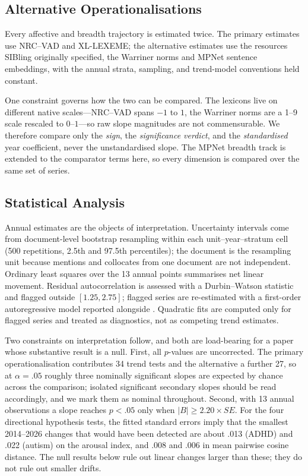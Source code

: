 \documentclass[final]{clv2025}
\begin{document}
\subsection{Alternative Operationalisations}
\label{sec:alternatives}

Every affective and breadth trajectory is estimated twice. The primary estimates use
NRC--VAD and XL-LEXEME; the alternative estimates use the resources SIBling originally
specified, the Warriner norms and MPNet sentence embeddings, with the annual strata,
sampling, and trend-model conventions held constant.

One constraint governs how the two can be compared. The lexicons live on different native
scales---NRC--VAD spans $-1$ to $1$, the Warriner norms are a 1--9 scale rescaled to
$0$--$1$---so raw slope magnitudes are not commensurable. We therefore compare only the
\emph{sign}, the \emph{significance verdict}, and the \emph{standardised} year
coefficient, never the unstandardised slope. The MPNet breadth track is extended to the comparator
terms here, so every dimension is compared over the same set of series.

\subsection{Statistical Analysis}
\label{sec:stats}

Annual estimates are the objects of interpretation. Uncertainty intervals come from
document-level bootstrap resampling within each unit--year--stratum cell (500 repetitions,
2.5th and 97.5th percentiles); the document is the resampling unit because mentions and
collocates from one document are not independent. Ordinary least squares over the 13 annual
points summarises net linear movement. Residual autocorrelation is assessed with a
Durbin--Watson statistic and flagged outside $[1.25, 2.75]$; flagged series are re-estimated
with a first-order autoregressive model reported alongside
\citep{chatterjeeRegressionAnalysisExample2012}. Quadratic fits are computed only for
flagged series and treated as diagnostics, not as competing trend estimates.

Two constraints on interpretation follow, and both are load-bearing for a paper whose
substantive result is a null. First, all $p$-values are uncorrected. The primary
operationalisation contributes 34 trend tests and the alternative a further 27, so at
$\alpha = .05$ roughly three nominally significant slopes are expected by chance across the
comparison; isolated significant secondary slopes should be read accordingly, and we mark
them as nominal throughout.
Second, with 13 annual observations a slope reaches $p<.05$ only when
$|B| \geq 2.20 \times \mathit{SE}$. For the four directional hypothesis tests, the fitted
standard errors imply that the smallest 2014--2026 changes that would have been detected
are about .013 (ADHD) and .022 (autism) on the arousal index, and .008 and .006 in mean
pairwise cosine distance. The null results below rule out linear changes larger than these; they do not rule
out smaller drifts.
\end{document}
